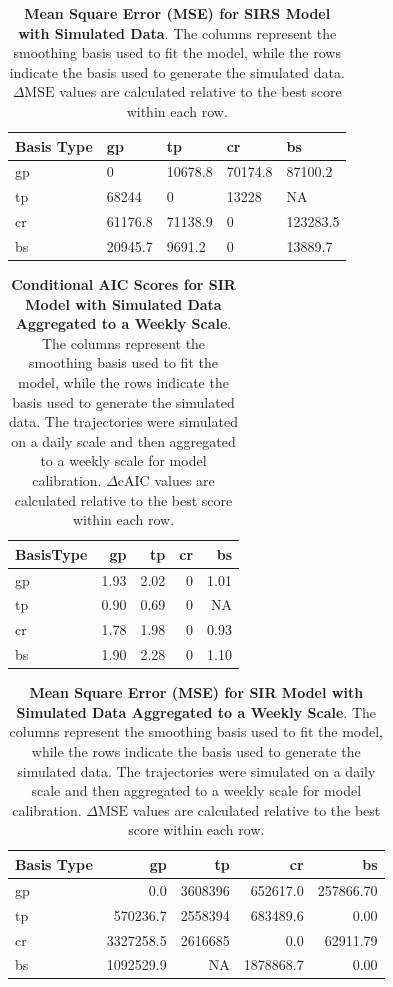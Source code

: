 \documentclass[
11pt, %
oneside, %
english, %
singlespacing, %
]{macthesis} %
\begin{document}
\begin{table}[!h]
\centering
\caption{\label{tab:mse-table-sim}\textbf{Mean Square Error (MSE) for SIRS Model with Simulated Data}. The columns represent the smoothing basis used to fit the model, while the rows indicate the basis used to generate the simulated data.  \(\Delta \text{MSE}\) values are calculated relative to the best score within each row.}
\centering
\begin{tabular}[t]{lllll}
\toprule
Basis Type & gp & tp & cr & bs\\
\midrule
gp & 0 & 10678.8 & 70174.8 & 87100.2\\
tp & 68244 & 0 & 13228 & NA\\
cr & 61176.8 & 71138.9 & 0 & 123283.5\\
bs & 20945.7 & 9691.2 & 0 & 13889.7\\
\bottomrule
\end{tabular}
\end{table}

\begin{table}[!h]
\centering
\caption{\label{tab:aic-table-sim-agg}\textbf{Conditional AIC Scores for SIR Model with Simulated Data Aggregated to a Weekly Scale}. The columns represent the smoothing basis used to fit the model, while the rows indicate the basis used to generate the simulated data. The trajectories were simulated on a daily scale and then aggregated to a weekly scale for model calibration. \(\Delta \text{cAIC}\) values are calculated relative to the best score within each row.}
\centering
\begin{tabular}[t]{lrrrr}
\toprule
BasisType & gp & tp & cr & bs\\
\midrule
gp & 1.93 & 2.02 & 0 & 1.01\\
tp & 0.90 & 0.69 & 0 & NA\\
cr & 1.78 & 1.98 & 0 & 0.93\\
bs & 1.90 & 2.28 & 0 & 1.10\\
\bottomrule
\end{tabular}
\end{table}

\begin{table}[!h]
\centering
\caption{\label{tab:mse-table-sim-agg}\textbf{Mean Square Error (MSE) for SIR Model with Simulated Data Aggregated to a Weekly Scale}. The columns represent the smoothing basis used to fit the model, while the rows indicate the basis used to generate the simulated data. The trajectories were simulated on a daily scale and then aggregated to a weekly scale for model calibration. \(\Delta \text{MSE}\) values are calculated relative to the best score within each row.}
\centering
\begin{tabular}[t]{lrrrr}
\toprule
Basis Type & gp & tp & cr & bs\\
\midrule
gp & 0.0 & 3608396 & 652617.0 & 257866.70\\
tp & 570236.7 & 2558394 & 683489.6 & 0.00\\
cr & 3327258.5 & 2616685 & 0.0 & 62911.79\\
bs & 1092529.9 & NA & 1878868.7 & 0.00\\
\bottomrule
\end{tabular}
\end{table}
\end{document}
